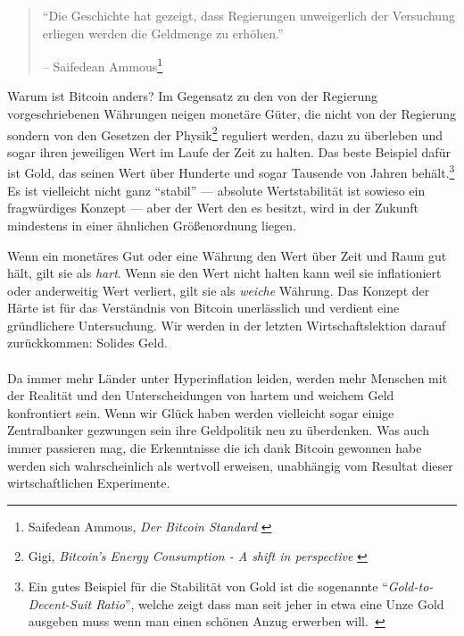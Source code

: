 \begin{quotation}\begin{samepage}
\enquote{Die Geschichte hat gezeigt, dass Regierungen unweigerlich der
Versuchung erliegen werden die Geldmenge zu erhöhen.}
\begin{flushright} -- Saifedean Ammous\footnote{Saifedean Ammous, \textit{Der
Bitcoin Standard} \cite{bitcoin-standard}}
\end{flushright}\end{samepage}\end{quotation}

Warum ist Bitcoin anders? Im Gegensatz zu den von der Regierung vorgeschriebenen
Währungen neigen monetäre Güter, die nicht von der Regierung sondern von den
Gesetzen der Physik\footnote{Gigi, \textit{Bitcoin's Energy Consumption - A
shift in perspective} \cite{gigi:energy}} reguliert werden, dazu zu überleben
und sogar ihren jeweiligen Wert im Laufe der Zeit zu halten. Das beste Beispiel
dafür ist Gold, das seinen Wert über Hunderte und sogar Tausende von Jahren
behält.\footnote{Ein gutes Beispiel für die Stabilität von Gold ist die
sogenannte \enquote{\textit{Gold-to-Decent-Suit Ratio}}, welche zeigt dass man
seit jeher  in etwa eine Unze Gold ausgeben muss wenn man einen schönen Anzug
erwerben will.~\cite{web:gold-to-decent-suite-ratio}} Es ist vielleicht nicht
ganz \enquote{stabil} --- absolute Wertstabilität ist sowieso ein fragwürdiges
Konzept --- aber der Wert den es besitzt, wird in der Zukunft mindestens in
einer ähnlichen Größenordnung liegen.

Wenn ein monetäres Gut oder eine Währung den Wert über Zeit und Raum gut hält,
gilt sie als \textit{hart}. Wenn sie den Wert nicht halten kann weil sie
inflationiert oder anderweitig Wert verliert, gilt sie als \textit{weiche}
Währung. Das Konzept der Härte ist für das Verständnis von Bitcoin unerlässlich
und verdient eine gründlichere Untersuchung. Wir werden in der letzten
Wirtschaftslektion darauf zurückkommen: Solides Geld.

\paragraph{}
Da immer mehr Länder unter Hyperinflation leiden, werden mehr Menschen mit der
Realität und den Unterscheidungen von hartem und weichem Geld konfrontiert sein.
Wenn wir Glück haben werden vielleicht sogar einige Zentralbanker gezwungen sein
ihre Geldpolitik neu zu überdenken. Was auch immer passieren mag, die
Erkenntnisse die ich dank Bitcoin gewonnen habe werden sich wahrscheinlich als
wertvoll erweisen, unabhängig vom Resultat dieser wirtschaftlichen Experimente.

